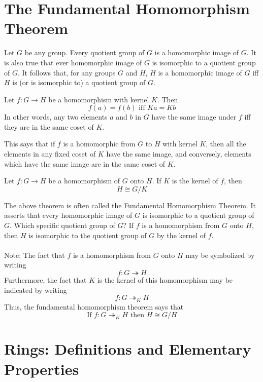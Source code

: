 \documentclass[12pt]{article}
\begin{document}
\section{The Fundamental Homomorphism Theorem}

Let $G$ be any group. Every quotient group of $G$ is a homomorphic image of $G$. It is also true that ever homomorphic image of $G$ is isomorphic to a quotient group of $G$. It follows that, for any groups $G$ and $H$, $H$ is a homomorphic image of $G$ iff $H$ is (or is isomorphic to) a quotient group of $G$. 

\begin{theorem} Let $f: G \to H$ be a homomorphism with kernel $K$. Then $$f(a) = f(b) \text{ iff } Ka = Kb$$ In other words, any two elements $a$ and $b$ in $G$ have the same image under $f$ iff they are in the same coset of $K$. \end{theorem} 

This says that if $f$ is a homomorphic from $G$ to $H$ with kernel $K$, then all the elements in any fixed coset of $K$ have the same image, and conversely, elements which have the same image are in the same coset of $K$. 

\begin{theorem} Let $f: G \to H$ be a homomorphism of $G$ onto $H$. If $K$ is the kernel of $f$, then $$H \cong G/K $$ \end{theorem} 

The above theorem is often called the Fundamental Homomorphism Theorem. It asserts that every homomorphic image of $G$ is isomorphic to a quotient group of $G$. Which specific quotient group of $G$? If $f$ is a homomorphism from $G$ onto $H$, then $H$ is isomorphic to the quotient group of $G$ by the kernel of $f$. \\~\\
Note: The fact that $f$ is a homomorphism from $G$ onto $H$ may be symbolized by writing $$f: G \twoheadrightarrow H$$ Furthermore, the fact that $K$ is the kernel of this homomorphism may be indicated by writing $$f: G \twoheadrightarrow_K H$$ Thus, the fundamental homomorphism theorem says that 
$$ \text{If } f: G \twoheadrightarrow_K H \text{ then } H \cong G/H $$ 

\section{Rings: Definitions and Elementary Properties}
\end{document}
